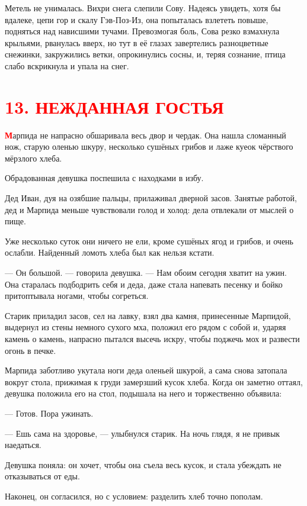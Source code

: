 \documentclass[oneside,final,14pt]{extreport}
\begin{document}
	Метель не унималась. Вихри снега слепили Сову. Надеясь увидеть, хотя бы вдалеке, цепи гор и скалу Гэв-Поз-Из, она попыталась взлететь повыше, подняться над нависшими тучами. Превозмогая боль, Сова резко взмахнула крыльями, рванулась вверх, но тут в её глазах завертелись разноцветные снежинки, закружились ветки, опрокинулись сосны, и, теряя сознание, птица слабо вскрикнула и упала на снег.
	
	
	
		\section[13. Нежданная гостья]{\center \textcolor{red}{13. НЕЖДАННАЯ ГОСТЬЯ}}
		
	
	\lettrine[findent=0pt]{\textbf{\textcolor{red}{М}}}{}арпида не напрасно обшаривала весь двор и чердак. Она нашла сломанный нож, старую оленью шкуру, несколько сушёных грибов и лаже куеок чёрствого мёрзлого хлеба.
	
	Обрадованная девушка поспешила с находками в избу.
	
	Дед Иван, дуя на озябшие пальцы, прилаживал дверной засов. Занятые работой, дед и Марпида меньше чувствовали голод и холод: дела отвлекали от мыслей о пище.
	
	Уже несколько суток они ничего не ели, кроме сушёных ягод и грибов, и очень ослабли. Найденный ломоть хлеба был как нельзя кстати.
	
	— Он большой. — говорила девушка. — Нам обоим сегодня хватит на ужин. Она старалась подбодрить себя и деда, даже стала напевать песенку и бойко притоптывала ногами, чтобы согреться.
	
	Старик приладил засов, сел на лавку, взял два камня, принесенные Марпидой, выдернул из стены немного сухого мха, положил его рядом с собой и, ударяя камень о камень, напрасно пытался высечь искру, чтобы поджечь мох и развести огонь в печке.
	
	Марпида заботливо укутала ноги деда оленьей шкурой, а сама снова затопала вокруг стола, прижимая к груди замерзший кусок хлеба. Когда он заметно оттаял, девушка положила его на стол, подышала на него и торжественно объявила:
	
	— Готов. Пора ужинать.
	
	— Ешь сама на здоровье, — улыбнулся старик. На ночь глядя, я не привык наедаться.
	
	Девушка поняла: он хочет, чтобы она съела весь кусок, и стала убеждать не отказываться от еды.
	
	Наконец, он согласился, но с условием: разделить хлеб точно пополам.
	
\end{document}
